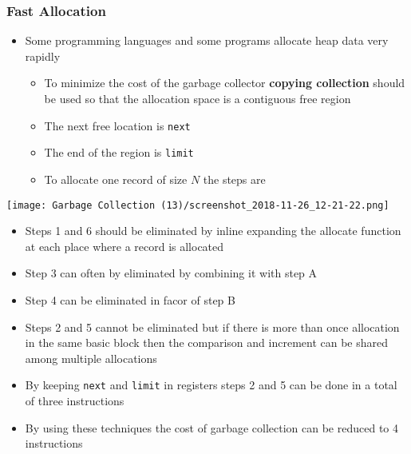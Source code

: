 \documentclass[11pt]{article}
\begin{document}
\subsubsection{Fast Allocation}
\label{sec:org13f4d37}
\begin{itemize}
\item Some programming languages and some programs allocate heap data very rapidly
\begin{itemize}
\item To minimize the cost of the garbage collector \textbf{copying collection} should be used so that the allocation space is a contiguous free region
\item The next free location is \texttt{next}
\item The end of the region is \texttt{limit}
\item To allocate one record of size \(N\) the steps are
\end{itemize}
\end{itemize}
\begin{center}
\texttt{[image: Garbage Collection (13)/screenshot\_2018-11-26\_12-21-22.png]}
\end{center}
\begin{itemize}
\item Steps 1 and 6 should be eliminated by inline expanding the allocate function at each place where a record is allocated
\item Step 3 can often by eliminated by combining it with step A
\item Step 4 can be eliminated in facor of step B
\item Steps 2 and 5 cannot be eliminated but if there is more than once allocation in the same basic block then the comparison and increment can be shared among multiple allocations
\item By keeping \texttt{next} and \texttt{limit} in registers steps 2 and 5 can be done in a total of three instructions
\item By using these techniques the cost of garbage collection can be reduced to 4 instructions
\end{itemize}
\end{document}
